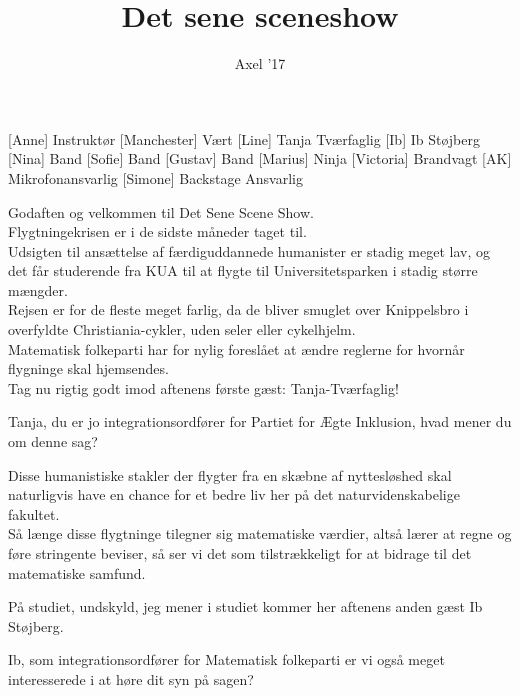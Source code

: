 \documentclass[a4paper,11pt]{article}
\title{Det sene sceneshow}
\author{Axel '17}
\begin{document}
\maketitle

\begin{roles}
[Anne] Instruktør
[Manchester] Vært
[Line] Tanja Tværfaglig
[Ib] Ib Støjberg
[Nina] Band
[Sofie] Band
[Gustav] Band
[Marius] Ninja
[Victoria] Brandvagt
[AK] Mikrofonansvarlig
[Simone] Backstage Ansvarlig
\end{roles}


\begin{sketch}

Godaften og velkommen til Det Sene Scene Show. \\
Flygtningekrisen er i de sidste måneder taget til.\\
Udsigten til ansættelse af færdiguddannede humanister er stadig meget lav, og det får studerende fra KUA til at flygte til Universitetsparken i stadig større mængder.\\
Rejsen er for de fleste meget farlig, da de bliver smuglet over Knippelsbro i overfyldte Christiania-cykler, uden seler eller cykelhjelm.\\
Matematisk folkeparti har for nylig foresl\aa et at \ae ndre reglerne for hvorn\aa r flygninge skal hjemsendes.\\
Tag nu rigtig godt imod aftenens første gæst: Tanja-Tværfaglig!
 
  Tanja, du er jo integrationsordfører for Partiet for Ægte Inklusion, hvad mener du om denne sag?

Disse humanistiske stakler der flygter fra en skæbne af nyttesløshed skal naturligvis have en chance for et bedre liv her på det naturvidenskabelige fakultet.\\
Så længe disse flygtninge tilegner sig matematiske værdier, altså lærer at regne og føre stringente beviser, så ser vi det som tilstrækkeligt for at bidrage til det matematiske samfund. 

På studiet, undskyld, jeg mener i studiet kommer her aftenens anden gæst Ib Støjberg.

Ib, som integrationsordfører for Matematisk folkeparti er vi også meget interesserede i at høre dit syn på sagen?


\end{sketch}
\end{document}

